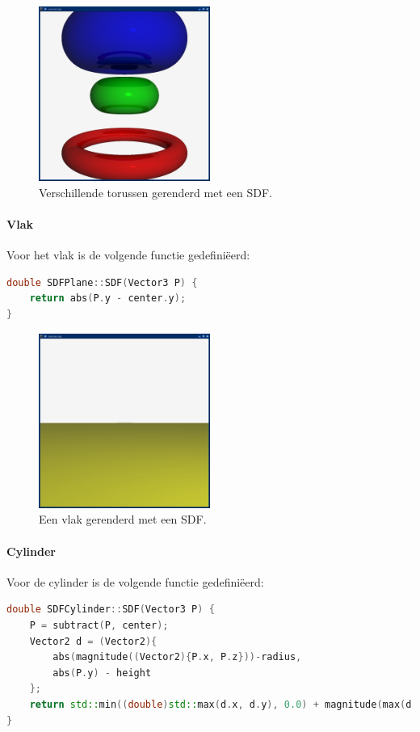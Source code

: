 \documentclass[12pt, a4paper]{article}
\begin{document}
\begin{figure}[H]
    \centering
    \includegraphics[width=0.50\textwidth]{renders/tori.png}
    \caption{Verschillende torussen gerenderd met een SDF.}
    \label{fig:tori}
\end{figure}

\paragraph{Vlak}
Voor het vlak is de volgende functie gedefiniëerd:
\begin{lstlisting}[language=C++]
double SDFPlane::SDF(Vector3 P) {
    return abs(P.y - center.y);
}
\end{lstlisting}



\begin{figure}[H]
    \centering
    \includegraphics[width=0.50\textwidth]{renders/plane.png}
    \caption{Een vlak gerenderd met een SDF.}
    \label{fig:plane}
\end{figure}

\paragraph{Cylinder}
Voor de cylinder is de volgende functie gedefiniëerd:
\begin{lstlisting}[language=C++]
double SDFCylinder::SDF(Vector3 P) {
    P = subtract(P, center);
    Vector2 d = (Vector2){
        abs(magnitude((Vector2){P.x, P.z}))-radius,
        abs(P.y) - height
    };
    return std::min((double)std::max(d.x, d.y), 0.0) + magnitude(max(d, 0.0));
}
\end{lstlisting}
\end{document}
